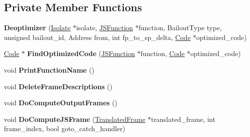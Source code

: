 \subsection*{Private Member Functions}
\begin{DoxyCompactItemize}
\item 
{\bfseries Deoptimizer} (\hyperlink{classv8_1_1internal_1_1_isolate}{Isolate} $\ast$isolate, \hyperlink{classv8_1_1internal_1_1_j_s_function}{J\+S\+Function} $\ast$function, Bailout\+Type type, unsigned bailout\+\_\+id, Address from, int fp\+\_\+to\+\_\+sp\+\_\+delta, \hyperlink{classv8_1_1internal_1_1_code}{Code} $\ast$optimized\+\_\+code)\hypertarget{classv8_1_1internal_1_1_deoptimizer_a40dbf6106fa49466d64028eea281bcce}{}\label{classv8_1_1internal_1_1_deoptimizer_a40dbf6106fa49466d64028eea281bcce}

\item 
\hyperlink{classv8_1_1internal_1_1_code}{Code} $\ast$ {\bfseries Find\+Optimized\+Code} (\hyperlink{classv8_1_1internal_1_1_j_s_function}{J\+S\+Function} $\ast$function, \hyperlink{classv8_1_1internal_1_1_code}{Code} $\ast$optimized\+\_\+code)\hypertarget{classv8_1_1internal_1_1_deoptimizer_a158f8abed8ce0e96fea700f42639d7e7}{}\label{classv8_1_1internal_1_1_deoptimizer_a158f8abed8ce0e96fea700f42639d7e7}

\item 
void {\bfseries Print\+Function\+Name} ()\hypertarget{classv8_1_1internal_1_1_deoptimizer_aa897dd9c7683235ec1247651a48d70c8}{}\label{classv8_1_1internal_1_1_deoptimizer_aa897dd9c7683235ec1247651a48d70c8}

\item 
void {\bfseries Delete\+Frame\+Descriptions} ()\hypertarget{classv8_1_1internal_1_1_deoptimizer_a8d76ffab6701b233e5efdc81112168a2}{}\label{classv8_1_1internal_1_1_deoptimizer_a8d76ffab6701b233e5efdc81112168a2}

\item 
void {\bfseries Do\+Compute\+Output\+Frames} ()\hypertarget{classv8_1_1internal_1_1_deoptimizer_a691d5a9c5e548c7e83e97489f5e43a8b}{}\label{classv8_1_1internal_1_1_deoptimizer_a691d5a9c5e548c7e83e97489f5e43a8b}

\item 
void {\bfseries Do\+Compute\+J\+S\+Frame} (\hyperlink{classv8_1_1internal_1_1_translated_frame}{Translated\+Frame} $\ast$translated\+\_\+frame, int frame\+\_\+index, bool goto\+\_\+catch\+\_\+handler)\hypertarget{classv8_1_1internal_1_1_deoptimizer_ad0a29815afde7a992953608141f08b8c}{}\label{classv8_1_1internal_1_1_deoptimizer_ad0a29815afde7a992953608141f08b8c}


\end{DoxyCompactItemize}
